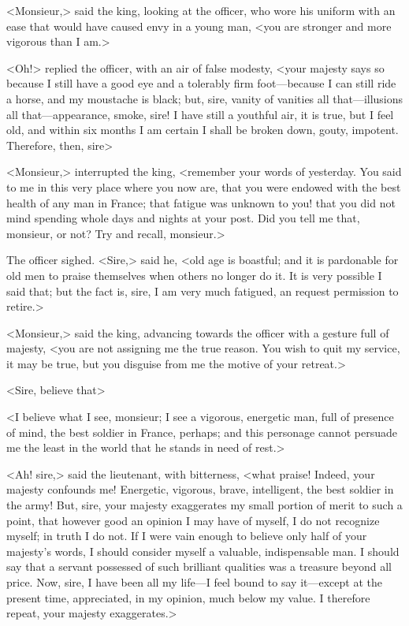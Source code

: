 <Monsieur,> said the king, looking at the officer, who wore his uniform with an ease that would have caused envy in a young man, <you are stronger and more vigorous than I am.>

<Oh!> replied the officer, with an air of false modesty, <your majesty says so because I still have a good eye and a tolerably firm foot—because I can still ride a horse, and my moustache is black; but, sire, vanity of vanities all that—illusions all that—appearance, smoke, sire! I have still a youthful air, it is true, but I feel old, and within six months I am certain I shall be broken down, gouty, impotent. Therefore, then, sire\longdash>

<Monsieur,> interrupted the king, <remember your words of yesterday. You said to me in this very place where you now are, that you were endowed with the best health of any man in France; that fatigue was unknown to you! that you did not mind spending whole days and nights at your post. Did you tell me that, monsieur, or not? Try and recall, monsieur.>

The officer sighed. <Sire,> said he, <old age is boastful; and it is pardonable for old men to praise themselves when others no longer do it. It is very possible I said that; but the fact is, sire, I am very much fatigued, an request permission to retire.>

<Monsieur,> said the king, advancing towards the officer with a gesture full of majesty, <you are not assigning me the true reason. You wish to quit my service, it may be true, but you disguise from me the motive of your retreat.>

<Sire, believe that\longdash>

<I believe what I see, monsieur; I see a vigorous, energetic man, full of presence of mind, the best soldier in France, perhaps; and this personage cannot persuade me the least in the world that he stands in need of rest.>

<Ah! sire,> said the lieutenant, with bitterness, <what praise! Indeed, your majesty confounds me! Energetic, vigorous, brave, intelligent, the best soldier in the army! But, sire, your majesty exaggerates my small portion of merit to such a point, that however good an opinion I may have of myself, I do not recognize myself; in truth I do not. If I were vain enough to believe only half of your majesty's words, I should consider myself a valuable, indispensable man. I should say that a servant possessed of such brilliant qualities was a treasure beyond all price. Now, sire, I have been all my life—I feel bound to say it—except at the present time, appreciated, in my opinion, much below my value. I therefore repeat, your majesty exaggerates.>

